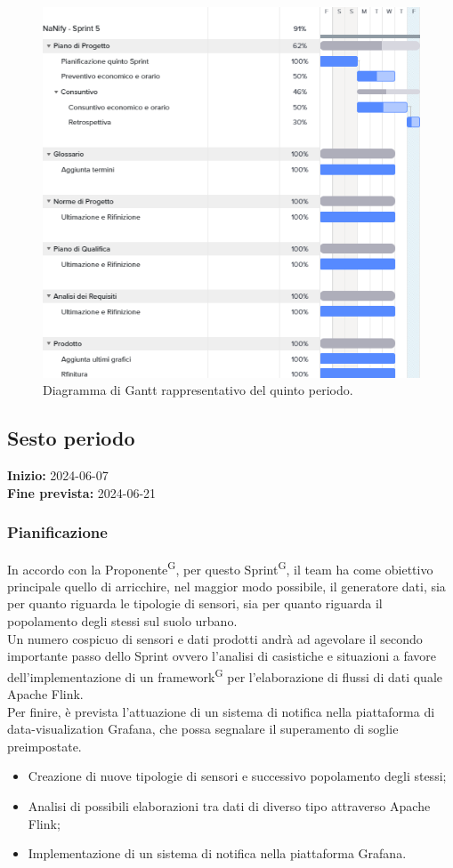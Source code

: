 \documentclass[8pt]{article}
\newcommand{\glossterm}[1]{#1\textsuperscript{G}} %
\begin{document}
\begin{figure}[h!]
    \centering
    \includegraphics[width=13cm]{./images_pdp/gantt5.png}
    \caption{Diagramma di Gantt rappresentativo del quinto periodo.}
\end{figure}
\clearpage

\subsection{Sesto periodo} 
\textbf{Inizio:} 2024-06-07\\
\textbf{Fine prevista:} 2024-06-21
\subsubsection{Pianificazione}
In accordo con la \glossterm{Proponente}, per questo \glossterm{Sprint}, il team ha come obiettivo principale quello di arricchire, nel maggior modo possibile, il generatore dati, sia per quanto riguarda le tipologie di sensori, sia per quanto riguarda il popolamento degli stessi sul suolo urbano. \\
Un numero cospicuo di sensori e dati prodotti andrà ad agevolare il secondo importante passo dello Sprint ovvero l'analisi di casistiche e situazioni a favore dell'implementazione di un \glossterm{framework} per l'elaborazione di flussi di dati quale Apache Flink.\\
Per finire, è prevista l'attuazione di un sistema di notifica nella piattaforma di data-visualization Grafana, che possa segnalare il superamento di soglie preimpostate.
\begin{itemize}
    \setlength{\itemsep}{0em}
        \item Creazione di nuove tipologie di sensori e successivo popolamento degli stessi;
        \item Analisi di possibili elaborazioni tra dati di diverso tipo attraverso Apache Flink;
        \item Implementazione di un sistema di notifica nella piattaforma Grafana.
    \end{itemize}
\end{document}
